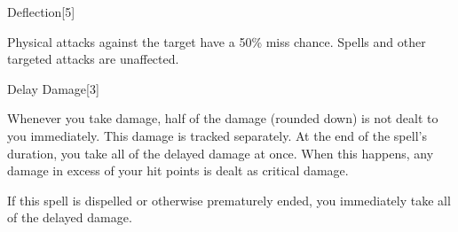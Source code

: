 \begin{spellsection}{Deflection}[5]
    \begin{spellheader}
    \end{spellheader}
    \begin{spellcontent}
        \begin{spelltargetinginfo}
        \end{spelltargetinginfo}
        \begin{spelleffects}
            \spelleffect Physical attacks against the target have a 50\% miss chance.
            Spells and other targeted attacks are unaffected.
            \spelldur \durshort
        \end{spelleffects}
    \end{spellcontent}
    \begin{spellfooter}
        \miscastexplode
    \end{spellfooter}
\end{spellsection}

\begin{spellsection}{Delay Damage}[3]
    \begin{spellheader}
    \end{spellheader}
    \begin{spellcontent}
        \begin{spelltargetinginfo}
        \end{spelltargetinginfo}
        \begin{spelleffects}
            \spelleffect Whenever you take damage, half of the damage (rounded down) is not dealt to you immediately. This damage is tracked separately. At the end of the spell's duration, you take all of the delayed damage at once. When this happens, any damage in excess of your hit points is dealt as critical damage.
            \spelldur \durmed
        \end{spelleffects}
        \begin{spellfooter}
            \spellnotes If this spell is dispelled or otherwise prematurely ended, you immediately take all of the delayed damage.
            \miscastexplode
        \end{spellfooter}
    \end{spellcontent}
\end{spellsection}

